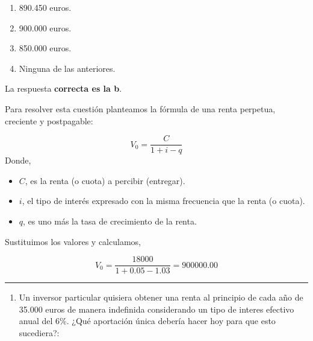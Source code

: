 \documentclass[
  letterpaper,
  DIV=11,
  numbers=noendperiod]{scrreprt}
\providecommand{\tightlist}{%
  \setlength{\itemsep}{0pt}\setlength{\parskip}{0pt}}\usepackage{longtable,booktabs,array}
\begin{document}
\begin{enumerate}
\def\labelenumi{\alph{enumi}.}
\item
  890.450 euros.
\item
  900.000 euros.
\item
  850.000 euros.
\item
  Ninguna de las anteriores.
\end{enumerate}

\begin{tcolorbox}[enhanced jigsaw, left=2mm, opacityback=0, colback=white, breakable, arc=.35mm, bottomrule=.15mm, rightrule=.15mm, toprule=.15mm, leftrule=.75mm, colframe=quarto-callout-tip-color-frame]
\begin{minipage}[t]{5.5mm}
\textcolor{quarto-callout-tip-color}{\faLightbulb}
\end{minipage}%
\begin{minipage}[t]{\textwidth - 5.5mm}

La respuesta \textbf{correcta es la b}.

Para resolver esta cuestión planteamos la fórmula de una renta perpetua,
creciente y postpagable:

\[V_0=\frac{C}{1+i-q}\] Donde,

\begin{itemize}
\item
  \(C\), es la renta (o cuota) a percibir (entregar).
\item
  \(i\), el tipo de interés expresado con la misma frecuencia que la
  renta (o cuota).
\item
  \(q\), es uno más la tasa de crecimiento de la renta.
\end{itemize}

Sustituimos los valores y calculamos,

\[V_0=\frac{18000}{1+0.05-1.03}=900000.00\]

\end{minipage}%
\end{tcolorbox}

\begin{center}\rule{0.5\linewidth}{0.5pt}\end{center}

\begin{enumerate}
\def\labelenumi{\arabic{enumi}.}
\setcounter{enumi}{89}
\tightlist
\item
  Un inversor particular quisiera obtener una renta al principio de cada
  año de 35.000 euros de manera indefinida considerando un tipo de
  interes efectivo anual del 6\%. ¿Qué aportación única debería hacer
  hoy para que esto sucediera?:
\end{enumerate}
\end{document}
